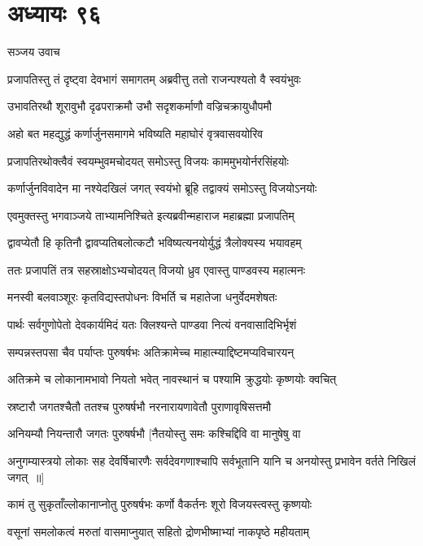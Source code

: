 \chapter{अध्यायः ९६}
\twolineshloka
{सञ्जय उवाच}
{}


\twolineshloka
{प्रजापतिस्तु तं दृष्ट्वा देवभागं समागतम्}
{अब्रवीत्तु ततो राजन्पश्यतो वै स्वयंभुवः}


\twolineshloka
{उभावतिरथौ शूरावुभौ दृढपराक्रमौ}
{उभौ सदृशकर्माणौ वज्रिचक्रायुधौपमौ}


\twolineshloka
{अहो बत महद्युद्धं कर्णार्जुनसमागमे}
{भविष्यति महाघोरं वृत्रवासवयोरिव}


\twolineshloka
{प्रजापतिरथोक्त्वैवं स्वयम्भुवमचोदयत्}
{समोऽस्तु विजयः काममुभयोर्नरसिंहयोः}


\twolineshloka
{कर्णार्जुनविवादेन मा नश्येदखिलं जगत्}
{स्वयंभो ब्रूहि तद्वाक्यं समोऽस्तु विजयोऽनयोः}


\twolineshloka
{एवमुक्तस्तु भगवाञ्जये ताभ्यामनिश्चिते}
{इत्यब्रवीन्महाराज महाब्रह्मा प्रजापतिम्}


\twolineshloka
{द्वावप्येतौ हि कृतिनौ द्वावप्यतिबलोत्कटौ}
{भविष्यत्यनयोर्युद्धं त्रैलोक्यस्य भयावहम्}


\twolineshloka
{ततः प्रजापतिं तत्र सहस्राक्षोऽभ्यचोदयत्}
{विजयो ध्रुव एवास्तु पाण्डवस्य महात्मनः}


\twolineshloka
{मनस्वी बलवाञ्शूरः कृतविद्यस्तपोधनः}
{विभर्ति च महातेजा धनुर्वेदमशेषतः}


\twolineshloka
{पार्थः सर्वगुणोपेतो देवकार्यमिदं यतः}
{क्लिश्यन्ते पाण्डवा नित्यं वनवासादिभिर्भृशं}


\twolineshloka
{सम्पन्नस्तपसा चैव पर्याप्तः पुरुषर्षभः}
{अतिक्रामेच्च माहात्म्याद्दिष्टमप्यविचारयन्}


\twolineshloka
{अतिक्रमे च लोकानामभावो नियतो भवेत्}
{नावस्थानं च पश्यामि क्रुद्धयोः कृष्णयोः क्वचित्}


\twolineshloka
{स्रष्टारौ जगतश्चैतौ ततश्च पुरुषर्षभौ}
{नरनारायणावेतौ पुराणावृषिसत्तमौ}


\twolineshloka
{अनियम्यौ नियन्तारौ जगतः पुरुषर्षभौ}
{[नैतयोस्तु समः कश्चिद्दिवि वा मानुषेषु वा}


\threelineshloka
{अनुगम्यास्त्रयो लोकाः सह देवर्षिचारणैः}
{सर्वदेवगणाश्चापि सर्वभूतानि यानि च}
{अनयोस्तु प्रभावेन वर्तते निखिलं जगत् ॥]}


\twolineshloka
{कामं तु सुकृताँल्लोकानाप्नोतु पुरुषर्षभः}
{कर्णो वैकर्तनः शूरो विजयस्त्वस्तु कृष्णयोः}


\twolineshloka
{वसूनां समलोकत्वं मरुतां वासमाप्नुयात्}
{सहितो द्रोणभीष्माभ्यां नाकपृष्ठे महीयताम्}


